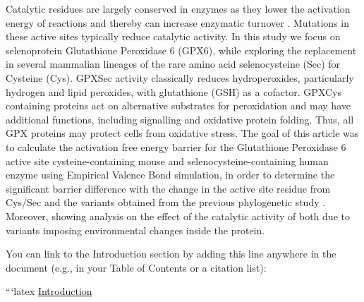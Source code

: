 \documentclass[journal=jacsat,manuscript=article]{achemso}
\begin{document}
Catalytic residues are largely conserved in enzymes as they lower the activation energy of reactions and thereby can increase enzymatic turnover \cite{rees_ancient_2024}. Mutations in these active sites typically reduce catalytic activity. In this study we focus on selenoprotein Glutathione Peroxidase 6 (GPX6), while exploring the replacement in several mammalian lineages of the rare amino acid selenocysteine (Sec) for Cysteine (Cys). GPXSec activity classically reduces hydroperoxides, particularly hydrogen and lipid peroxides, with glutathione (GSH) as a cofactor. GPXCys containing proteins act on alternative substrates for peroxidation and may have additional functions, including signalling and oxidative protein folding. Thus, all GPX proteins may protect cells from oxidative stress. The goal of this article was to calculate the activation free energy barrier for the Glutathione Peroxidase 6 active site cysteine-containing mouse and selenocysteine-containing human enzyme using Empirical Valence Bond simulation, in order to determine the significant barrier difference with the change in the active site residue from Cys/Sec and the variants obtained from the previous phylogenetic study \cite{rees_ancient_2024}. Moreover, showing analysis on the effect of the catalytic activity of both due to variants imposing environmental changes inside the protein.  

You can link to the Introduction section by adding this line anywhere in the document (e.g., in your Table of Contents or a citation list):

```latex
\hyperref[sec:intro]{Introduction}
\end{document}
